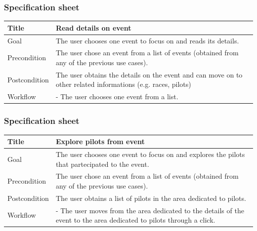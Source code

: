 \documentclass{beamer}
\begin{document}
\begin{frame}
    \frametitle{Specification sheet}
    \begin{table}
        \tiny
        \begin{tabular}{|p{2cm}|p{6cm}|}
        \hline
        Title & \textbf{Read details on event} \\
        \hline
        Goal & The user chooses one event to focus on and reads its details. \\
        \hline
        Precondition & The user chose an event from a list of events (obtained from any of the previous use cases).\\
        \hline
        Postcondition & The user obtains the details on the event and can move on to other related
        informations (e.g. races, pilots) \\
        \hline
        Workflow &
        - The user chooses one event from a list. \\
        \hline
        \end{tabular}
\end{table}
\end{frame}

\begin{frame}
    \frametitle{Specification sheet}
    \begin{table}
        \tiny
        \begin{tabular}{|p{2cm}|p{6cm}|}
        \hline  
        Title & \textbf{Explore pilots from event} \\
        \hline
        Goal & The user chooses one event to focus on and explores the pilots that partecipated to the event. \\
        \hline
        Precondition & The user chose an event from a list of events (obtained from any of the previous use cases).\\
        \hline
        Postcondition & The user obtains a list of pilots in the area dedicated to pilots. \\
        \hline
        Workflow &
        - The user moves from the area dedicated to the details of the event to the
        area dedicated to pilots through a click. \\
        \hline
        \end{tabular}
\end{table}
\end{frame}
\end{document}
